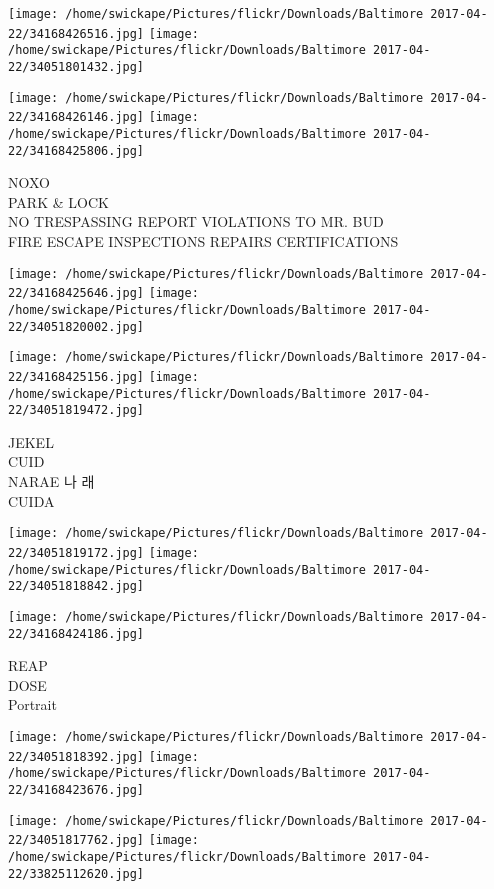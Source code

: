 \documentclass[10pt,letterpaper]{article}
\begin{document}
\texttt{[image: /home/swickape/Pictures/flickr/Downloads/Baltimore 2017-04-22/34168426516.jpg]}
\texttt{[image: /home/swickape/Pictures/flickr/Downloads/Baltimore 2017-04-22/34051801432.jpg]}

\texttt{[image: /home/swickape/Pictures/flickr/Downloads/Baltimore 2017-04-22/34168426146.jpg]}
\texttt{[image: /home/swickape/Pictures/flickr/Downloads/Baltimore 2017-04-22/34168425806.jpg]}

NOXO\\
PARK \& LOCK\\
NO TRESPASSING REPORT VIOLATIONS TO MR. BUD\\
FIRE ESCAPE INSPECTIONS REPAIRS CERTIFICATIONS\\
\pagebreak

\texttt{[image: /home/swickape/Pictures/flickr/Downloads/Baltimore 2017-04-22/34168425646.jpg]}
\texttt{[image: /home/swickape/Pictures/flickr/Downloads/Baltimore 2017-04-22/34051820002.jpg]}

\texttt{[image: /home/swickape/Pictures/flickr/Downloads/Baltimore 2017-04-22/34168425156.jpg]}
\texttt{[image: /home/swickape/Pictures/flickr/Downloads/Baltimore 2017-04-22/34051819472.jpg]}

JEKEL\\
CUID\\
NARAE 나 래\\
CUIDA\\
\pagebreak

\texttt{[image: /home/swickape/Pictures/flickr/Downloads/Baltimore 2017-04-22/34051819172.jpg]}
\texttt{[image: /home/swickape/Pictures/flickr/Downloads/Baltimore 2017-04-22/34051818842.jpg]}

\vspace{0.25in}
\texttt{[image: /home/swickape/Pictures/flickr/Downloads/Baltimore 2017-04-22/34168424186.jpg]}

REAP\\
DOSE\\
Portrait\\
\pagebreak

\texttt{[image: /home/swickape/Pictures/flickr/Downloads/Baltimore 2017-04-22/34051818392.jpg]}
\texttt{[image: /home/swickape/Pictures/flickr/Downloads/Baltimore 2017-04-22/34168423676.jpg]}

\texttt{[image: /home/swickape/Pictures/flickr/Downloads/Baltimore 2017-04-22/34051817762.jpg]}
\texttt{[image: /home/swickape/Pictures/flickr/Downloads/Baltimore 2017-04-22/33825112620.jpg]}
\end{document}

